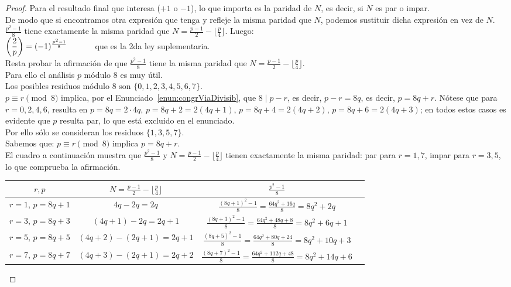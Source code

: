 \begin{proof}
Para el resultado final que interesa ($+1$ o $-1$), lo que importa es la paridad de $N$, es decir, si $N$ es par o impar. \\
De modo que si encontramos otra expresión que tenga y refleje la misma paridad que $N$, podemos sustituir dicha expresión en vez de $N$. \\
$\frac{p^2 -1}{8}$ tiene exactamente la misma paridad que $N=\frac{p-1}{2} - \lfloor\frac{p}{4}\rfloor$. Luego: \\
$\left(\dfrac{2}{p}\right) = (-1)^{\frac{p^2-1}{8}} \qquad \quad$ que es la 2da ley suplementaria. \\
Resta probar la afirmación de que $\frac{p^2 -1}{8}$ tiene la misma paridad que $N=\frac{p-1}{2} - \lfloor\frac{p}{4}\rfloor$. \\
Para ello el análisis $p$ módulo $8$ es muy útil. \\
Los posibles residuos módulo $8$ son $\{ 0,1,2,3,4,5,6,7 \}$. \\
$p \equiv r \pmod 8$ implica, por el Enunciado~\ref{enun:congrViaDivisib}, que $8 \mid p-r$, es decir, $p-r = 8q$, es decir, $p = 8q+r$. Nótese que para $r=0,2,4,6$, resulta en $p = 8q = 2\cdot4q$, $p = 8q+2 = 2(4q+1)$, $p = 8q+4 = 2(4q+2)$, $p = 8q+6 = 2(4q+3)$; en todos estos casos es evidente que $p$ resulta par, lo que está excluido en el enunciado. \\
Por ello sólo se consideran los residuos $\{ 1,3,5,7 \}$. \\
Sabemos que: $p \equiv r \pmod 8$ implica $p = 8q+r$. \\
El cuadro a continuación muestra que $\frac{p^2 -1}{8}$ y $N=\frac{p-1}{2} - \lfloor\frac{p}{4}\rfloor$ tienen exactamente la misma paridad: par para $r=1,7$, impar para $r=3,5$, lo que comprueba la afirmación.
\begin{center}
\begin{tabular}{|c|c|c|c|}
\hline
$r,p$ & $N=\frac{p-1}{2} - \lfloor\frac{p}{4}\rfloor$ & $\frac{p^2 -1}{8}$ \\
\hline
$r=1$, $p = 8q+1$ & $4q - 2q = 2q$ & $\frac{(8q+1)^2-1}{8}=\frac{64q^2+ 16q}{8} = 8q^2 + 2q$ \\
\hline
$r=3$, $p = 8q+3$ & $(4q+1) - 2q = 2q+1$ & $\frac{(8q+3)^2 - 1}{8} =\frac{64q^2+ 48q + 8}{8} = 8q^2+ 6q + 1$ \\
\hline
$r=5$, $p = 8q+5$ & $(4q+2) - (2q+1) = 2q+1$ & $\frac{(8q+5)^2 - 1}{8} = \frac{64q^2 + 80q + 24}{8} = 8q^2+ 10q + 3$ \\
\hline
$r=7$, $p = 8q+7$ & $(4q+3) - (2q+1) = 2q+2$ & $\frac{(8q+7)^2 - 1}{8} = \frac{64q^2+ 112q + 48}{8} = 8q^2+ 14q + 6$ \\
\hline
\end{tabular}
\label{tab:tablaParidad}
\end{center}
\end{proof}

